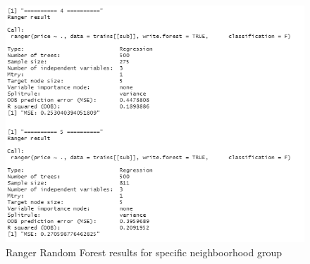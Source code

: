 \documentclass{FR16}
\begin{document}
\begin{figure}[!htb]
\begin{minipage}{0.48\textwidth}
     \includegraphics[width=1\linewidth]{figures/rgn1.2.png}
   \end{minipage}
        \caption{Ranger Random Forest results for specific neighboorhood group}\label{fig:17}

\end{figure}
\end{document}
